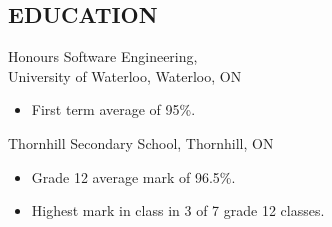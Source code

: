 \documentclass[11pt, margin, line]{res}
\begin{document}
\begin{resume}
            


\section{EDUCATION} 
        Honours Software Engineering, \\
        University of Waterloo, Waterloo, ON
        \begin{itemize}
            \item First term average of 95\%.
        \end{itemize}

        Thornhill Secondary School, Thornhill, ON
        \begin{itemize}
            \item Grade 12 average mark of 96.5\%.
            \item Highest mark in class in 3 of 7 grade 12 classes.
        \end{itemize}


\end{resume}
\end{document}
